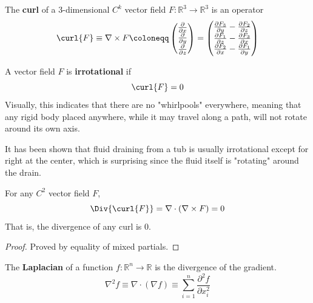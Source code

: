   \begin{definition}[Curl]
		The \textbf{curl} of a 3-dimensional $C^k$ vector field $F: \mathbb{R}^3 \longrightarrow \mathbb{R}^3$ is an operator
		\begin{equation}
			\curl{F} \equiv \nabla \times F \coloneqq 
			\begin{pmatrix}
				\frac{\partial}{\partial x} \\ \frac{\partial}{\partial y} \\ \frac{\partial}{\partial z} 
			\end{pmatrix} 
				= \begin{pmatrix}
				\frac{\partial F_3}{\partial y} - \frac{\partial F_2}{\partial z} \\
				\frac{\partial F_1}{\partial z} - \frac{\partial F_3}{\partial x} \\
				\frac{\partial F_2}{\partial x} - \frac{\partial F_1}{\partial y}
			\end{pmatrix}
		\end{equation}
  \end{definition}

  \begin{definition}
		A vector field $F$ is \textbf{irrotational} if 
		\begin{equation}
			\curl{F} = 0
		\end{equation}
		Visually, this indicates that there are no "whirlpools" everywhere, meaning that any rigid body placed anywhere, while it may travel along a path, will not rotate around its own axis. 
  \end{definition}

  It has been shown that fluid draining from a tub is usually irrotational except for right at the center, which is surprising since the fluid itself is "rotating" around the drain. 

	\begin{theorem}
		For any $C^2$ vector field $F$, 
		\begin{equation}
			\Div{\curl{F}} = \nabla\cdot (\nabla \times F) = 0
		\end{equation}
		That is, the divergence of any curl is 0. 
  \end{theorem}
  \begin{proof}
		Proved by equality of mixed partials. 
  \end{proof}

	\begin{definition}[Laplacian]
		The \textbf{Laplacian} of a function $f: \mathbb{R}^n \longrightarrow \mathbb{R}$ is the divergence of the gradient. 
		\begin{equation}
			\nabla^2 f \equiv \nabla \cdot (\nabla f) \equiv \sum_{i=1}^n \frac{\partial^2 f}{\partial x_i^2}
		\end{equation}
  \end{definition}

